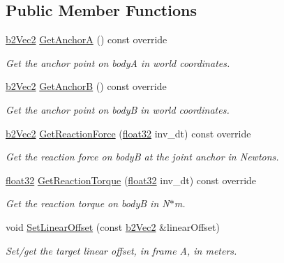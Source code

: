 \subsection*{Public Member Functions}
\begin{DoxyCompactItemize}
\item 
\mbox{\hyperlink{structb2_vec2}{b2\+Vec2}} \mbox{\hyperlink{classb2_motor_joint_a58adfab0fe79d254347a367341b0963a}{Get\+AnchorA}} () const override
\begin{DoxyCompactList}\small\item\em Get the anchor point on bodyA in world coordinates. \end{DoxyCompactList}\item 
\mbox{\hyperlink{structb2_vec2}{b2\+Vec2}} \mbox{\hyperlink{classb2_motor_joint_a5d563fd070f7b6cfe8db6f83e1bebbcd}{Get\+AnchorB}} () const override
\begin{DoxyCompactList}\small\item\em Get the anchor point on bodyB in world coordinates. \end{DoxyCompactList}\item 
\mbox{\hyperlink{structb2_vec2}{b2\+Vec2}} \mbox{\hyperlink{classb2_motor_joint_a85a3ac568e797d0620dcf4f7532ed949}{Get\+Reaction\+Force}} (\mbox{\hyperlink{b2_settings_8h_aacdc525d6f7bddb3ae95d5c311bd06a1}{float32}} inv\+\_\+dt) const override
\begin{DoxyCompactList}\small\item\em Get the reaction force on bodyB at the joint anchor in Newtons. \end{DoxyCompactList}\item 
\mbox{\hyperlink{b2_settings_8h_aacdc525d6f7bddb3ae95d5c311bd06a1}{float32}} \mbox{\hyperlink{classb2_motor_joint_a542b68309e0294f8bda152eff92086d9}{Get\+Reaction\+Torque}} (\mbox{\hyperlink{b2_settings_8h_aacdc525d6f7bddb3ae95d5c311bd06a1}{float32}} inv\+\_\+dt) const override
\begin{DoxyCompactList}\small\item\em Get the reaction torque on bodyB in N$\ast$m. \end{DoxyCompactList}\item 
void \mbox{\hyperlink{classb2_motor_joint_a99254b5fc9ed9f2d0fdccada513000c3}{Set\+Linear\+Offset}} (const \mbox{\hyperlink{structb2_vec2}{b2\+Vec2}} \&linear\+Offset)
\begin{DoxyCompactList}\small\item\em Set/get the target linear offset, in frame A, in meters. \end{DoxyCompactList}\item 

\end{DoxyCompactItemize}
